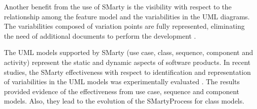 Another benefit from the use of SMarty is the visibility with respect to the relationship among the feature model and the variabilities in the UML diagrams. The variabilities composed of variation points are fully represented, eliminating the need of additional documents to perform the development \cite{oliveirajr10}.


The UML models supported by SMarty (use case, class, sequence, component and activity) represent the static and dynamic aspects of software products.  In recent studies, the SMarty effectiveness with respect to identification and representation of variabilities in the UML models was experimentally evaluated \cite{marcolino13, marcolino14a, marcolino14b, bera15}. The results provided evidence of the effectiveness from use case, sequence and component models. Also, they lead to the evolution of the SMartyProcess for class models.







